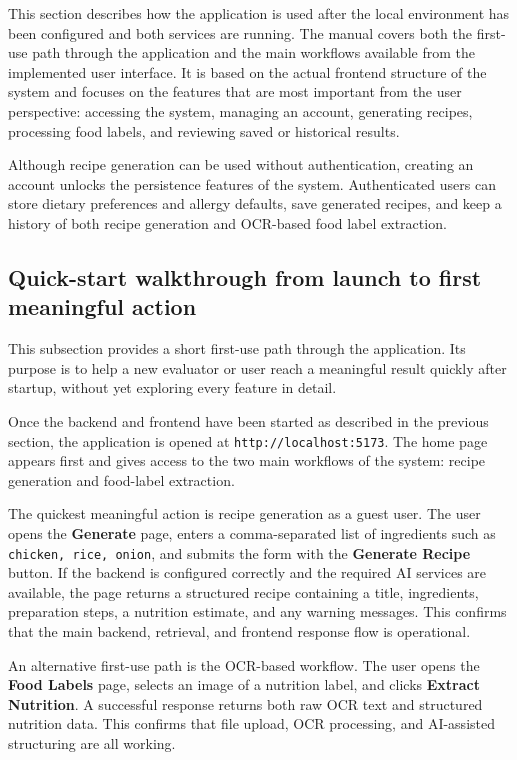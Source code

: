 This section describes how the application is used after the local
environment has been configured and both services are running. The
manual covers both the first-use path through the application and the
main workflows available from the implemented user interface. It is
based on the actual frontend structure of the system and focuses on
the features that are most important from the user perspective:
accessing the system, managing an account, generating recipes,
processing food labels, and reviewing saved or historical results.

Although recipe generation can be used without authentication,
creating an account unlocks the persistence features of the system.
Authenticated users can store dietary preferences and allergy
defaults, save generated recipes, and keep a history of both recipe
generation and OCR-based food label extraction.

\subsection{Quick-start walkthrough from launch to first meaningful action}

This subsection provides a short first-use path through the
application. Its purpose is to help a new evaluator or user reach a
meaningful result quickly after startup, without yet exploring every
feature in detail.

Once the backend and frontend have been started as described in the
previous section, the application is opened at
\texttt{http://localhost:5173}. The home page appears first and gives
access to the two main workflows of the system: recipe generation and
food-label extraction.

The quickest meaningful action is recipe generation as a guest user.
The user opens the \textbf{Generate} page, enters a comma-separated
list of ingredients such as \texttt{chicken, rice, onion}, and submits
the form with the \textbf{Generate Recipe} button. If the backend is
configured correctly and the required AI services are available, the
page returns a structured recipe containing a title, ingredients,
preparation steps, a nutrition estimate, and any warning messages.
This confirms that the main backend, retrieval, and frontend response
flow is operational.

An alternative first-use path is the OCR-based workflow. The user
opens the \textbf{Food Labels} page, selects an image of a nutrition
label, and clicks \textbf{Extract Nutrition}. A successful response
returns both raw OCR text and structured nutrition data. This confirms
that file upload, OCR processing, and AI-assisted structuring are all
working.

